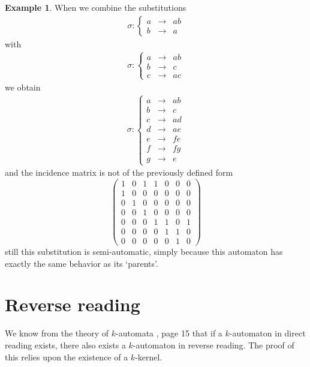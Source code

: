 \documentclass{article}
\theoremstyle{definition}
\newtheorem{example}[theorem]{Example}
\begin{document}
\begin{example} \label{ex:notclear}
When we combine the substitutions
\begin{eqnarray*}
\sigma: \left\{ \begin{array}{lll}
a &\rightarrow& ab\\
b &\rightarrow& a
\end{array} \right.
\end{eqnarray*}
with
\begin{eqnarray*}
\sigma: \left\{ \begin{array}{lll}
a &\rightarrow& ab\\
b &\rightarrow& c\\
c &\rightarrow& ac
\end{array} \right.
\end{eqnarray*}
we obtain
\begin{eqnarray*}
\sigma: \left\{ \begin{array}{lll}
a &\rightarrow& ab\\
b &\rightarrow& c\\
c &\rightarrow& ad\\
d &\rightarrow& ae\\
e &\rightarrow& fe\\
f &\rightarrow& fg\\
g &\rightarrow& e
\end{array} \right.
\end{eqnarray*}
and the incidence matrix is not of the previously defined form
\begin{displaymath} \left( \begin{array}{ccccccc}
1 & 0 & 1 & 1 & 0 & 0 & 0 \\
1 & 0 & 0 & 0 & 0 & 0 & 0 \\
0 & 1 & 0 & 0 & 0 & 0 & 0 \\
0 & 0 & 1 & 0 & 0 & 0 & 0 \\
0 & 0 & 0 & 1 & 1 & 0 & 1 \\
0 & 0 & 0 & 0 & 1 & 1 & 0 \\
0 & 0 & 0 & 0 & 0 & 1 & 0 
\end{array} \right) \end{displaymath}
still this substitution is semi-automatic, simply because this automaton has
exactly the same behavior as its `parents'.
\end{example}

\section{Reverse reading}
We know from the theory of $k$-automata \cite{Fogg}, page 15 that if a 
$k$-automaton in direct reading exists, there also exists a $k$-automaton in 
reverse reading. The proof of this relies upon the existence of a $k$-kernel.
\end{document}

